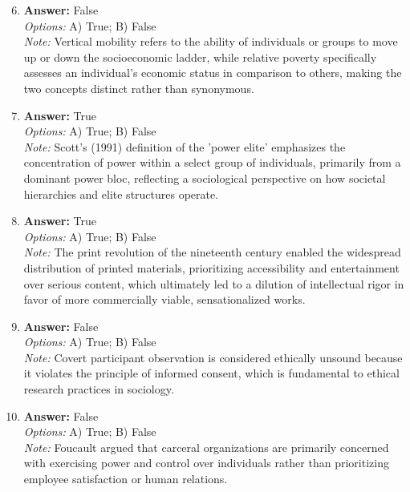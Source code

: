 \documentclass[12pt]{article}
\begin{document}
\begin{enumerate}[label=\arabic*.]
\setcounter{enumi}{5}
\item \textbf{Answer:} False
\\ \textit{Options:} A) True; B) False
\\ \textit{Note:} Vertical mobility refers to the ability of individuals or groups to move up or down the socioeconomic ladder, while relative poverty specifically assesses an individual's economic status in comparison to others, making the two concepts distinct rather than synonymous.
\item \textbf{Answer:} True
\\ \textit{Options:} A) True; B) False
\\ \textit{Note:} Scott's (1991) definition of the 'power elite' emphasizes the concentration of power within a select group of individuals, primarily from a dominant power bloc, reflecting a sociological perspective on how societal hierarchies and elite structures operate.
\item \textbf{Answer:} True
\\ \textit{Options:} A) True; B) False
\\ \textit{Note:} The print revolution of the nineteenth century enabled the widespread distribution of printed materials, prioritizing accessibility and entertainment over serious content, which ultimately led to a dilution of intellectual rigor in favor of more commercially viable, sensationalized works.
\item \textbf{Answer:} False
\\ \textit{Options:} A) True; B) False
\\ \textit{Note:} Covert participant observation is considered ethically unsound because it violates the principle of informed consent, which is fundamental to ethical research practices in sociology.
\item \textbf{Answer:} False
\\ \textit{Options:} A) True; B) False
\\ \textit{Note:} Foucault argued that carceral organizations are primarily concerned with exercising power and control over individuals rather than prioritizing employee satisfaction or human relations.
\end{enumerate}
\end{document}
